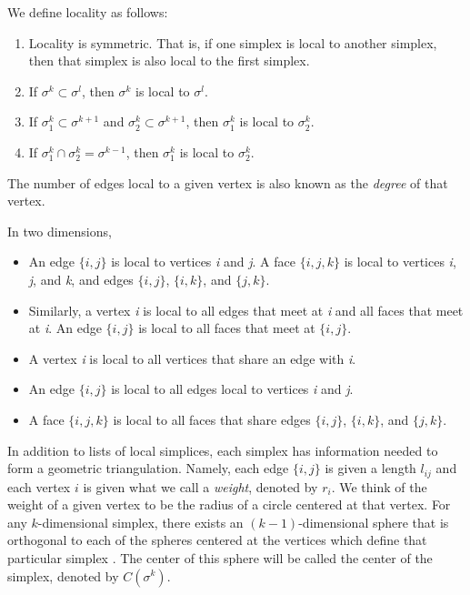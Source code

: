 \documentclass[12pt]{article}
\begin{document}
 We define locality as follows:
 \begin{enumerate}
 \item Locality is symmetric. That is, if one simplex is local to another simplex, then that simplex is also local to the first simplex.
 \item If $\sigma^k\subset\sigma^l$, then $\sigma^k$ is local to $\sigma^l$.
 \item If $\sigma^k_1\subset\sigma^{k+1}$ and $\sigma^k_2\subset\sigma^{k+1}$, then $\sigma^k_1$ is local to $\sigma^k_2$.
 \item If $\sigma^k_1\cap\sigma^k_2 = \sigma^{k-1}$, then $\sigma^k_1$ is local to $\sigma^k_2$.
 \end{enumerate}

The number of edges local to a given vertex is also known as the \textit{degree} of that vertex.

In two dimensions, 
\begin{itemize}
\item An edge $\{i, j\}$ is local to vertices \textit{i} and \textit{j}. A face $\{i, j, k\}$ is local to vertices \textit{i}, \textit{j}, and \textit{k}, and edges $\{i, j\}$, $\{i, k\}$, and $\{j, k\}$.
\item Similarly, a vertex \textit{i} is local to all edges that meet at \textit{i} and all faces that meet at \textit{i}. An edge $\{i, j\}$ is local to all faces that meet at $\{i, j\}$.
\item A vertex \textit{i} is local to all vertices that share an edge with \textit{i}.
\item An edge $\{i, j\}$ is local to all edges local to vertices \textit{i} and \textit{j}.
\item A face $\{i, j, k\}$ is local to all faces that share edges $\{i, j\}$, $\{i, k\}$, and $\{j, k\}$.
\end{itemize}

In addition to lists of local simplices, each simplex has information needed to form a geometric triangulation. Namely, each edge $\{i, j\}$ is given a length $l_{ij}$ and each vertex $i$ is given what we call a \textit{weight}, denoted by $r_i$. We think of the weight of a given vertex to be the radius of a circle centered at that vertex. For any $k$-dimensional simplex, there exists an $(k-1)$-dimensional sphere that is orthogonal to each of the spheres centered at the vertices which define that particular simplex \cite{Dave}. The center of this sphere will be called the center of the simplex, denoted by $C(\sigma^k)$.
\end{document}
